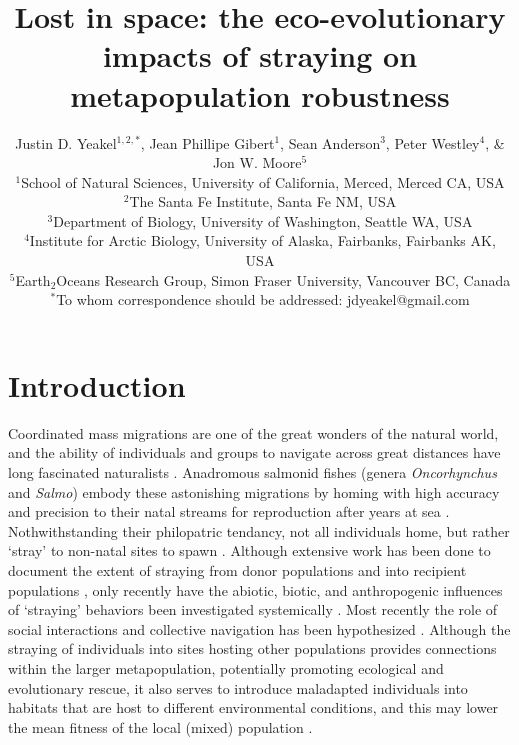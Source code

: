 \documentclass[twocolumn,preprintnumbers,amsmath,amssymb,superscriptaddress]{revtex4}
\begin{document}
\title{Lost in space: the eco-evolutionary impacts of straying on metapopulation robustness}
\author{Justin D. Yeakel${}^{1,2,*}$, Jean Phillipe Gibert${}^{1}$, Sean Anderson${}^{3}$, Peter Westley${}^{4}$, \& Jon W. Moore${}^{5}$ \\
${}^1$School of Natural Sciences, University of California, Merced, Merced CA, USA \\
${}^2$The Santa Fe Institute, Santa Fe NM, USA \\
${}^3$Department of Biology, University of Washington, Seattle WA, USA \\
${}^4$Institute for Arctic Biology, University of Alaska, Fairbanks, Fairbanks AK, USA \\
${}^5$Earth${}_2$Oceans Research Group, Simon Fraser University, Vancouver BC, Canada \\
${}^*$To whom correspondence should be addressed: jdyeakel@gmail.com
}



\maketitle



\section{Introduction}


Coordinated mass migrations are one of the great wonders of the natural world, and the ability of individuals and groups to navigate across great distances have long fascinated naturalists \cite{MilnerGulland:2011vm}.
Anadromous salmonid fishes (genera \emph{Oncorhynchus} and \emph{Salmo}) embody these astonishing migrations by homing with high accuracy and precision to their natal streams for reproduction after years at sea \cite{Quinn:2011tf,Jonsson:2011kg,Keefer:2014gg}.
Nothwithstanding their philopatric tendancy, not all individuals home, but rather `stray' to non-natal sites to spawn \cite{Quinn:1993ge,Hendry:2004wf,H:2013fs}.
Although extensive work has been done to document the extent of straying from donor populations and into recipient populations \cite{Keefer:2014gg,Bett:2017ha}, only recently have the abiotic, biotic, and anthropogenic influences of `straying' behaviors been investigated systemically \cite{Keefer:2008bs,Westley:2015to,Bond:2016dz}.
Most recently the role of social interactions and collective navigation has been hypothesized \cite[][; this volume]{Berdahl:2015kv,Berdahl:2016dx}.
Although the straying of individuals into sites hosting other populations provides connections within the larger metapopulation, potentially promoting ecological and evolutionary rescue, it also serves to introduce maladapted individuals into habitats that are host to different environmental conditions, and this may lower the mean fitness of the local (mixed) population \cite{Muhlfeld:2014hs}.
\end{document}
